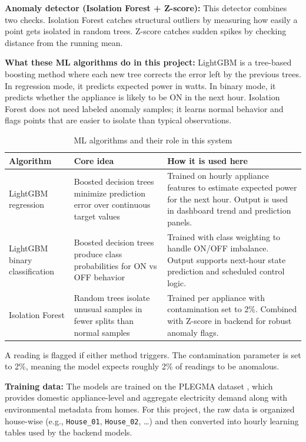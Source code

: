 \documentclass[12pt, a4paper]{article}
\numberwithin{figure}{section}
\numberwithin{table}{section}
\begin{document}
	\textbf{Anomaly detector (Isolation Forest + Z-score):} This detector combines two checks. Isolation Forest catches structural outliers by measuring how easily a point gets isolated in random trees. Z-score catches sudden spikes by checking distance from the running mean.
	
	\textbf{What these ML algorithms do in this project:} LightGBM is a tree-based boosting method where each new tree corrects the error left by the previous trees. In regression mode, it predicts expected power in watts. In binary mode, it predicts whether the appliance is likely to be ON in the next hour. Isolation Forest does not need labeled anomaly samples; it learns normal behavior and flags points that are easier to isolate than typical observations.
	
	\begin{table}[H]
		\centering
		\caption{ML algorithms and their role in this system}
		\label{tab:ml-algorithm-role}
		\vspace{6pt}
		\small
		\begin{tabularx}{\textwidth}{|p{3.2cm}|p{5.0cm}|X|}
			\hline
			\textbf{Algorithm} & \textbf{Core idea} & \textbf{How it is used here} \\
			\hline
			LightGBM regression & Boosted decision trees minimize prediction error over continuous target values & Trained on hourly appliance features to estimate expected power for the next hour. Output is used in dashboard trend and prediction panels. \\
			\hline
			LightGBM binary classification & Boosted decision trees produce class probabilities for ON vs OFF behavior & Trained with class weighting to handle ON/OFF imbalance. Output supports next-hour state prediction and scheduled control logic. \\
			\hline
			Isolation Forest & Random trees isolate unusual samples in fewer splits than normal samples & Trained per appliance with contamination set to 2\%. Combined with Z-score in backend for robust anomaly flags. \\
			\hline
		\end{tabularx}
		\normalsize
	\end{table}
	
	A reading is flagged if either method triggers. The contamination parameter is set to 2\%, meaning the model expects roughly 2\% of readings to be anomalous.
	
	\textbf{Training data:} The models are trained on the PLEGMA dataset \cite{plegma}, which provides domestic appliance-level and aggregate electricity demand along with environmental metadata from homes. For this project, the raw data is organized house-wise (e.g., \texttt{House\_01}, \texttt{House\_02}, \dots) and then converted into hourly learning tables used by the backend models.
	
\end{document}
